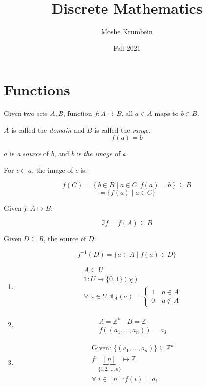 \documentclass[00_complete]{subfiles}
\title{Discrete Mathematics}
\author{Moshe Krumbein}
\date{Fall 2021}
\begin{document}

\section{Functions}

Given two sets $A, B$, function $f: A \mapsto B$, all $a \in A$ maps to $b \in B$.

$A$ is called the \emph{domain} and $B$ is called the \emph{range}.
$$f(a)=b$$

$a$ is \emph{a source} of $b$, and $b$ is \emph{the image} of $a$.

For $c \subset a$, the image of $c$ is:

$$f(C) = \left\{b \in B \mid a \in C : f(a) = b \right\} \subseteq B$$
$$=\{f(a) \mid a \in C\}$$

\begin{example}
Given $f: A \mapsto B$:

$$\Im f = f(A) \subseteq B$$

Given $D \subseteq B$, the source of $D$:

$$ f^{-1}(D) = \{a \in A \mid f(a) \in D\}$$

\begin{enumerate}
\item
\begin{gather*}
A \subseteq U \\
\mathds{1}: U \mapsto \{0,1\} (\chi) \\
\forall \; a \in U, \mathds{1}_A(a) = \begin{cases}
    1 \quad a \in A \\
    0 \quad a \notin A
\end{cases}
\end{gather*}

\item
\begin{gather*}
    A = \mathbb{Z}^k \quad B = \mathbb{Z} \\
    f((a_1, \ldots, a_n)) = a_3
\end{gather*}

\item
\begin{gather*}
    \text{Given: }\{(a_1, \ldots, a_n)\} \subseteq \mathbb{Z}^k \\
    f: \underbrace{[n]}_{\{1,2,\ldots,n\}} \mapsto \mathbb{Z} \\
    \forall \; i \in [n] : f(i)= a_i
\end{gather*}

\end{enumerate}
\end{example}
\end{document}
